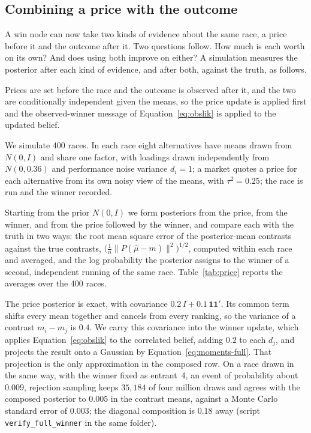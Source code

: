 \documentclass[11pt]{article}
\begin{document}
\subsection{Combining a price with the outcome}
\label{sec:compose}

A win node can now take two kinds of evidence about the same race, a
price before it and the outcome after it. Two questions follow. How
much is each worth on its own? And does using both improve on either?
A simulation measures the posterior after each kind of
evidence, and after both, against the truth, as follows.

Prices are set before the race and the outcome is observed after it,
and the two are conditionally independent given the means, so the
price update is applied first and the observed-winner message of
Equation~\eqref{eq:obslik} is applied to the updated belief.

We simulate 400 races. In each race eight alternatives have means
drawn from $N(0,I)$ and share one factor, with loadings drawn
independently from $N(0,0.36)$ and performance noise variance
$d_i=1$; a market quotes a price for
each alternative from its own noisy view of the means, with
$\tau^2=0.25$; the race is run and the winner recorded.

Starting from the prior $N(0,I)$ we form posteriors from the price,
from the winner, and from the price followed by the winner, and
compare each with the truth in two ways: the root mean square error
of the posterior-mean contrasts against the true contrasts,
$\bigl(\tfrac1n\lVert P(\hat\mu-m)\rVert^2\bigr)^{1/2}$, computed
within each race and averaged, and the log probability the posterior
assigns to the winner of a second, independent running of the same
race. Table~\ref{tab:price} reports the averages over the 400 races.

The price posterior is exact, with covariance
$0.2\,I+0.1\,\mathbf{1}\mathbf{1}'$. Its common term shifts every
mean together and cancels from every ranking, so the variance of a
contrast $m_i-m_j$ is $0.4$. We carry this covariance into the winner
update, which applies Equation~\eqref{eq:obslik} to the correlated
belief, adding $0.2$ to each $d_j$, and projects the result onto a
Gaussian by Equation~\eqref{eq:moments-full}.
That projection is the only approximation in the composed row. On a
race drawn in the same way, with the winner fixed as entrant~4, an
event of probability about $0.009$, rejection sampling keeps $35{,}184$
of four million draws and agrees with the composed posterior to $0.005$ in the contrast means,
against a Monte Carlo standard error of $0.003$; the diagonal
composition is $0.18$ away (script
\texttt{verify\_full\_winner} in the same folder).
\end{document}
